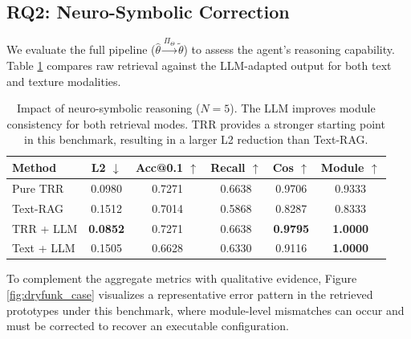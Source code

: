 \documentclass{article}
\begin{document}
	\subsection{RQ2: Neuro-Symbolic Correction}
	\label{ssec:llm_enhanced}
	
	We evaluate the full pipeline ($\hat{\theta} \xrightarrow{\Pi_{\Theta}} \tilde{\theta}$) to assess the agent's reasoning capability. Table \ref{tab:llm_enhancement} compares raw retrieval against the LLM-adapted output for both text and texture modalities.

\begin{table}[h]
	\centering
	\caption{Impact of neuro-symbolic reasoning ($N=5$). The LLM improves module consistency for both retrieval modes. TRR provides a stronger starting point in this benchmark, resulting in a larger L2 reduction than Text-RAG.}
	\label{tab:llm_enhancement}
	\begin{tabular}{lccccc}
		\toprule
		\textbf{Method}             & \textbf{L2} $\downarrow$ & \textbf{Acc@0.1} $\uparrow$ & \textbf{Recall} $\uparrow$ & \textbf{Cos} $\uparrow$ & \textbf{Module} $\uparrow$ \\
		\midrule
		Pure TRR                     & 0.0980                     & 0.7271           & 0.6638       & 0.9706       & 0.9333                 \\
		Text-RAG                     & 0.1512                     & 0.7014           & 0.5868       & 0.8287       & 0.8333                 \\
		\midrule
		TRR + LLM                    & \textbf{0.0852}            & 0.7271           & 0.6638       & \textbf{0.9795} & \textbf{1.0000}        \\
		Text + LLM                   & 0.1505                     & 0.6628           & 0.6330       & 0.9116       & \textbf{1.0000}        \\
		\bottomrule
	\end{tabular}
	\end{table}
	
	To complement the aggregate metrics with qualitative evidence, Figure \ref{fig:dryfunk_case} visualizes a representative error pattern in the retrieved prototypes under this benchmark, where module-level mismatches can occur and must be corrected to recover an executable configuration.
	
\end{document}
